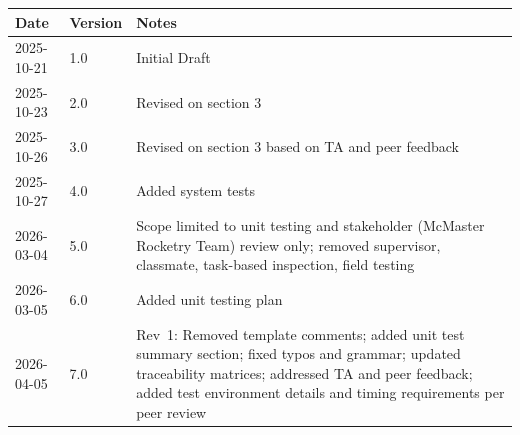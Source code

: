 \documentclass[12pt, titlepage]{article}
\begin{document}
\begin{tabularx}{\textwidth}{p{3cm}p{2cm}X}
  \toprule {\bf Date} & {\bf Version} & {\bf Notes}                                                                                                                                                                                                                       \\
  \midrule
  2025-10-21          & 1.0           & Initial Draft                                                                                                                                                                                                                     \\
  2025-10-23          & 2.0           & Revised on section 3                                                                                                                                                                                                              \\
  2025-10-26          & 3.0           & Revised on section 3 based on TA and peer feedback                                                                                                                                                                                \\
  2025-10-27          & 4.0           & Added system tests                                                                                                                                                                                                                \\
  2026-03-04          & 5.0           & Scope limited to unit testing and stakeholder (McMaster Rocketry Team) review only; removed supervisor, classmate, task-based inspection, field testing                                                                           \\
  2026-03-05          & 6.0           & Added unit testing plan                                                                                                                                                                                                           \\
  2026-04-05          & 7.0           & Rev~1: Removed template comments; added unit test summary section; fixed typos and grammar; updated traceability matrices; addressed TA and peer feedback; added test environment details and timing requirements per peer review \\
  \bottomrule
\end{tabularx}
\end{document}
